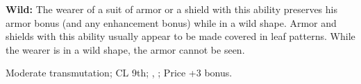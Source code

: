 
\textbf{Wild:} The wearer of a suit of armor or a shield with this ability preserves his armor bonus (and any enhancement bonus) while in a wild shape. Armor and shields with this ability usually appear to be made covered in leaf patterns. While the wearer is in a wild shape, the armor cannot be seen.

Moderate transmutation; CL 9th; , ; Price +3 bonus. 